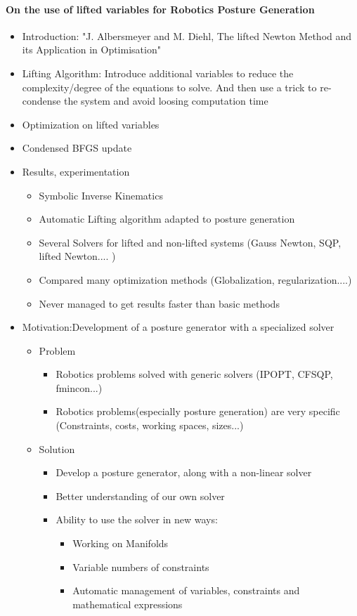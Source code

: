 \paragraph{On the use of lifted variables for Robotics Posture Generation}
\begin{itemize}
  \item {Introduction: "J. Albersmeyer and M. Diehl, The lifted Newton Method and its Application in Optimisation"}
  \item {Lifting Algorithm: Introduce additional variables to reduce the complexity/degree of the equations to solve. And then use a trick to re-condense the system and avoid loosing computation time}
  \item {Optimization on lifted variables}
  \item {Condensed BFGS update}
  \item {Results, experimentation}
  \begin{itemize}
    \item Symbolic Inverse Kinematics
    \item Automatic Lifting algorithm adapted to posture generation
    \item Several Solvers for lifted and non-lifted systems (Gauss Newton, SQP, lifted Newton.... )
    \item Compared many optimization methods (Globalization, regularization....)
    \item Never managed to get results faster than basic methods
  \end{itemize}
  \item{Motivation:Development of a posture generator with a specialized solver}
    \begin{itemize}
      \item Problem
        \begin{itemize}
          \item Robotics problems solved with generic solvers (IPOPT, CFSQP, fmincon...)
          \item Robotics problems(especially posture generation) are very specific (Constraints, costs, working spaces, sizes...)
        \end{itemize}
      \item Solution
        \begin{itemize}
          \item Develop a posture generator, along with a non-linear solver
          \item Better understanding of our own solver
          \item Ability to use the solver in new ways:
          \begin{itemize}
            \item Working on Manifolds
            \item Variable numbers of constraints
            \item Automatic management of variables, constraints and mathematical expressions
          \end{itemize}
        \end{itemize}
    \end{itemize}
\end{itemize}

